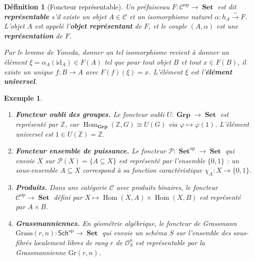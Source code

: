 \documentclass[a4paper,12pt]{book}
\DeclareMathOperator{\Hom}{Hom}
\DeclareMathOperator{\Set}{\mathbf{Set}}
\DeclareMathOperator{\Grp}{\mathbf{Grp}}
\newcommand{\op}{\mathrm{op}}
\newcommand{\id}{\mathrm{id}}
\newcommand{\Z}{\mathbb{Z}}
\newtheorem{definition}[theoreme]{Définition}
\newtheorem{exemple}[theoreme]{Exemple}
\begin{document}
\begin{definition}[Foncteur représentable]\label{def:foncteur-representable}
Un préfaisceau $F \colon \mathcal{C}^{\op} \to \Set$ est dit
\textbf{représentable} s'il existe un objet $A \in \mathcal{C}$
et un isomorphisme naturel $\alpha \colon h_A \xrightarrow{\sim} F$.
L'objet $A$ est appelé l'\textbf{objet représentant} de $F$,
et le couple $(A, \alpha)$ est une \textbf{représentation} de $F$.

Par le lemme de Yoneda, donner un tel isomorphisme revient
à donner un élément $\xi = \alpha_A(\id_A) \in F(A)$
tel que pour tout objet $B$ et tout $x \in F(B)$,
il existe un unique $f \colon B \to A$ avec $F(f)(\xi) = x$.
L'élément $\xi$ est l'\textbf{élément universel}.
\end{definition}

\begin{exemple}\label{ex:representables}
\begin{enumerate}[label=(\roman*)]
\item \textbf{Foncteur oubli des groupes.}
    Le foncteur oubli $U \colon \Grp \to \Set$ est représenté par $\Z$,
    car $\Hom_{\Grp}(\Z, G) \cong U(G)$ via $\varphi \mapsto \varphi(1)$.
    L'élément universel est $1 \in U(\Z) = \Z$.

\item \textbf{Foncteur ensemble de puissance.}
    Le foncteur $\mathcal{P} \colon \Set^{\op} \to \Set$ qui envoie
    $X$ sur $\mathcal{P}(X) = \{A \subseteq X\}$ est représenté
    par l'ensemble $\{0, 1\}$ : un sous-ensemble $A \subseteq X$
    correspond à sa fonction caractéristique $\chi_A \colon X \to \{0,1\}$.

\item \textbf{Produits.}
    Dans une catégorie $\mathcal{C}$ avec produits binaires, le foncteur
    $\mathcal{C}^{\op} \to \Set$ défini par
    $X \mapsto \Hom(X, A) \times \Hom(X, B)$
    est représenté par $A \times B$.

\item \textbf{Grassmanniennes.}
    En géométrie algébrique, le foncteur de Grassmann
    $\mathrm{Grass}(r, n) \colon \mathsf{Sch}^{\op} \to \Set$
    qui envoie un schéma $S$ sur l'ensemble des sous-fibrés localement
    libres de rang $r$ de $\mathcal{O}_S^n$ est représentable par
    la Grassmannienne $\mathrm{Gr}(r, n)$.
\end{enumerate}
\end{exemple}
\end{document}
